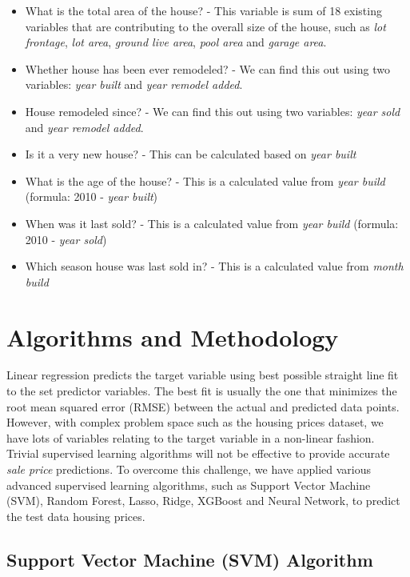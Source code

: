\documentclass[sigconf]{acmart}
\begin{document}
	\begin{itemize} 
		\item What is the total area of the house? - This variable is sum of 18  existing variables that are contributing to the overall size of the house, such as {\em lot frontage}, {\em lot area}, {\em ground live area}, {\em pool area} and {\em garage area}. 
		\item Whether house has been ever remodeled? - We can find this out using two variables: {\em year built} and {\em year remodel added}.
		\item House remodeled since? - We can find this out using two variables: {\em year sold} and {\em year remodel added}.
		\item Is it a very new house? - This can be calculated based on {\em year built}
		\item What is the age of the house? - This is a calculated value from {\em year build} (formula: 2010 - {\em year built})
		\item When was it last sold? - This is a calculated value from {\em year build} (formula: 2010 - {\em year sold})
		\item Which season house was last sold in? - This is a calculated value from {\em month build}
	\end{itemize}
	
	
	\section{Algorithms and Methodology}

	Linear regression predicts the target variable using best possible straight line fit to the set predictor variables. The best fit is usually the one that minimizes the root mean squared error (RMSE) between the actual and predicted data points. However, with complex problem space such as the housing prices dataset, we have lots of variables relating to the target variable in a non-linear fashion. Trivial supervised learning algorithms will not be effective to provide accurate {\em sale price} predictions. To overcome this challenge, we have applied various advanced supervised learning algorithms, such as Support Vector Machine (SVM), Random Forest, Lasso, Ridge, XGBoost and Neural Network, to predict the test data housing prices.
	
	 
	\subsection{Support Vector Machine (SVM) Algorithm}
\end{document}
